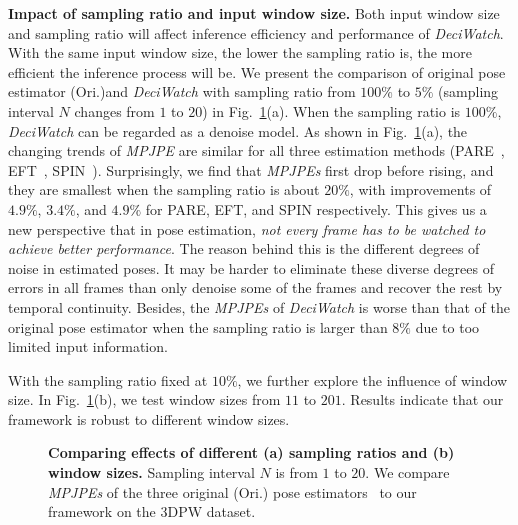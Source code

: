 \documentclass[runningheads]{llncs}
\newcommand{\name}{\emph{DeciWatch}\xspace}
\begin{document}
\noindent \textbf{Impact of sampling ratio and input window size.}
Both input window size and sampling ratio will affect inference efficiency and performance of \name. With the same input window size, the lower the sampling ratio is, the more efficient the inference process will be. We present the comparison of original pose estimator (Ori.)and \name with sampling ratio from $100\%$ to $5\%$ (sampling interval $N$ changes from $1$ to $20$) in Fig.~\ref{fig:supp_ablation_size}(a). When the sampling ratio is $100\%$, \name can be regarded as a denoise model. As shown in Fig.~\ref{fig:supp_ablation_size}(a), the changing trends of \emph{MPJPE} are similar for all three estimation methods (PARE~\cite{kocabas2021pare}, EFT~\cite{joo2020eft}, SPIN~\cite{kolotouros2019spin}). Surprisingly, we find that \emph{MPJPEs} first drop before rising, and they are smallest when the sampling ratio is about $20\%$, with improvements of $4.9\%$, $3.4\%$, and $4.9\%$ for PARE, EFT, and SPIN respectively. This gives us a new perspective that in pose estimation, \emph{not every frame has to be watched to achieve better performance}. The reason behind this is the different degrees of noise in estimated poses. It may be harder to eliminate these diverse degrees of errors in all frames than only denoise some of the frames and recover the rest by temporal continuity.
Besides, the \emph{MPJPEs} of \name is worse than that of the original pose estimator when the sampling ratio is larger than $8\%$ due to too limited input information.



With the sampling ratio fixed at $10\%$, we further explore the influence of window size. 
In Fig.~\ref{fig:supp_ablation_size}(b), we test window sizes from $11$ to $201$. Results indicate that our framework is robust to different window sizes. 

\begin{figure}[h]	
\centering
    	\label{fig:sample_ratio}  
    	\label{fig:window_size} 
\caption{\textbf{Comparing effects of different (a) sampling ratios and (b) window sizes.} Sampling interval $N$ is from $1$ to $20$. We compare \emph{MPJPEs} of the three original (Ori.) pose estimators~\cite{kocabas2021pare,joo2020eft,kolotouros2019spin} to our framework on the 3DPW dataset.}
\label{fig:supp_ablation_size} 
\end{figure}
\end{document}
